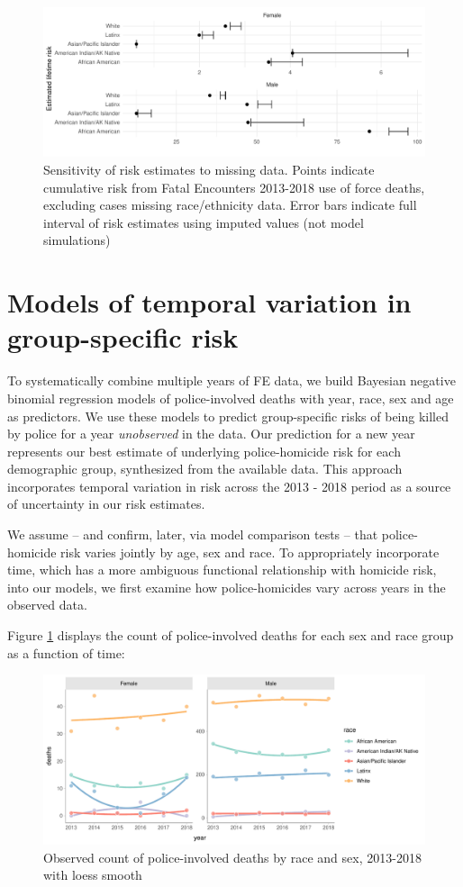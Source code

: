 \documentclass[9pt,twoside,lineno]{pnas-new}
\begin{document}
\begin{figure}[H]
	\includegraphics[width=\linewidth]{vis/imp_period_sensitivity.pdf}
	\caption{Sensitivity of risk estimates to missing data. Points indicate cumulative risk from Fatal Encounters 2013-2018 use of force deaths, excluding cases missing race/ethnicity data. Error bars indicate full interval of risk estimates using imputed values (not model simulations)}
\end{figure}


\section*{Models of temporal variation in group-specific risk}

To systematically combine multiple years of FE data, we build Bayesian negative binomial regression models of police-involved deaths with year, race, sex and age as predictors. We use these models to predict group-specific risks of being killed by police for a year \textit{unobserved} in the data. Our prediction for a new year represents our best estimate of underlying police-homicide risk for each demographic group, synthesized from the available data. This approach incorporates temporal variation in risk across the 2013 - 2018 period as a source of uncertainty in our risk estimates. 

We assume -- and confirm, later, via model comparison tests -- that police-homicide risk varies jointly by age, sex and race. To appropriately incorporate time, which has a more ambiguous functional relationship with homicide risk, into our models, we first examine how police-homicides vary across years in the observed data.  

Figure \ref{fig:a1} displays the count of police-involved deaths for each sex and race group as a function of time: 

\begin{figure}[H]
\center
\includegraphics[width = \linewidth]{vis/fig_a1.pdf}
\caption{Observed count of police-involved deaths by race and sex, 2013-2018 with loess smooth}
\label{fig:a1}
\end{figure}
\end{document}
